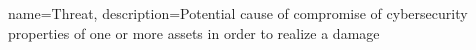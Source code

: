 
\makeglossaries




{
        name=Threat,
        description={Potential cause of compromise of cybersecurity properties of one or more assets in order to realize a damage}
}





